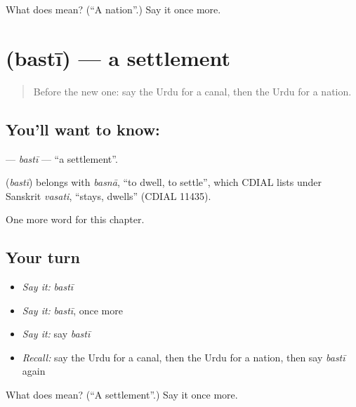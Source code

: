 \begin{tcolorbox}[breakable,colback=teal!4,colframe=teal!35!black,title={Before you move on}]
What does  mean? (\textquotedblleft{}A nation\textquotedblright{}.) Say it once more.
\end{tcolorbox}
\section[\texorpdfstring{\ur{بستی} (bastī)}{بستی (bastī)}]{ (bastī) — a settlement}

\label{lesson:UR-C158-basti}



\begin{quote}
Before the new one: say the Urdu for a canal, then the Urdu for a nation.
\end{quote}

\subsection*{You'll want to know: }
\textbf{} — \emph{bastī} — \textquotedblleft{}a settlement\textquotedblright{}.

\begin{cousinweb}
\textbf{} (\emph{bastī}) belongs with \emph{basnā}, \textquotedblleft{}to dwell, to settle\textquotedblright{}, which CDIAL lists under Sanskrit \emph{vasati}, \textquotedblleft{}stays, dwells\textquotedblright{} (CDIAL 11435).
\end{cousinweb}

\begin{grammarlens}[title={What you've built}]
One more word for this chapter.
\end{grammarlens}

\subsection*{Your turn}
\begin{itemize}
\raggedright
  \item \emph{Say it:} \emph{bastī}
  \item \emph{Say it:} \emph{bastī}, once more
  \item \emph{Say it:} say \emph{bastī}
  \item \emph{Recall:} say the Urdu for a canal, then the Urdu for a nation, then say \emph{bastī} again
\end{itemize}

\begin{tcolorbox}[breakable,colback=teal!4,colframe=teal!35!black,title={Before you move on}]
What does  mean? (\textquotedblleft{}A settlement\textquotedblright{}.) Say it once more.
\end{tcolorbox}
